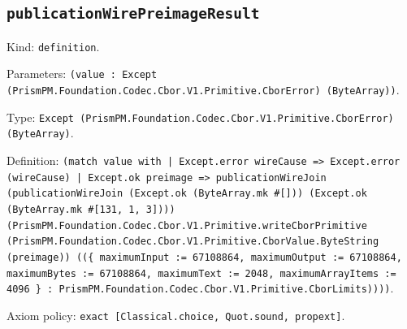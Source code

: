 \documentclass[11pt]{article}
\begin{document}
\subsection*{\texttt{publicationWirePreimageResult}}
\noindent Kind: \texttt{definition}.\par
\noindent Parameters: \texttt{(value : Except (PrismPM.Foundation.Codec.Cbor.V1.Primitive.CborError) (ByteArray))}.\par
\noindent Type: \texttt{Except (PrismPM.Foundation.Codec.Cbor.V1.Primitive.CborError) (ByteArray)}.\par
\noindent Definition: \texttt{(match value with | Except.error wireCause => Except.error (wireCause) | Except.ok preimage => publicationWireJoin (publicationWireJoin (Except.ok (ByteArray.mk \#[])) (Except.ok (ByteArray.mk \#[131, 1, 3]))) (PrismPM.Foundation.Codec.Cbor.V1.Primitive.writeCborPrimitive (PrismPM.Foundation.Codec.Cbor.V1.Primitive.CborValue.ByteString (preimage)) ((\{ maximumInput := 67108864, maximumOutput := 67108864, maximumBytes := 67108864, maximumText := 2048, maximumArrayItems := 4096 \} : PrismPM.Foundation.Codec.Cbor.V1.Primitive.CborLimits))))}.\par
\noindent Axiom policy: \texttt{exact [Classical.choice, Quot.sound, propext]}.\par
\end{document}
